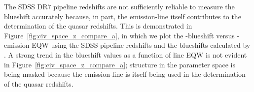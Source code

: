 The SDSS DR$7$ pipeline redshifts are not sufficiently reliable to measure the  blueshift accurately because, in part, the  emission-line itself contributes to the determination of the quasar redshifts. 
This is demonstrated in Figure~\ref{fig:civ_space_z_compare_a}, in which we plot the -blueshift versus -emission EQW using the SDSS pipeline redshifts and the blueshifts calculated by \citet{shen11}.  
A strong trend in the blueshift values as a function of line EQW is not evident in Figure~\ref{fig:civ_space_z_compare_a}; structure in the parameter space is being masked because the  emission-line is itself being used in the determination of the quasar redshifts. 

\begin{figure}
    \captionsetup[subfigure]{labelformat=empty}  
    \centering 
    \subfloat[\label{fig:civ_space_z_compare_a}]{}
    \subfloat[\label{fig:civ_space_z_compare_b}]{}
    \subfloat[\label{fig:civ_space_z_compare_c}]{}

\end{figure}
